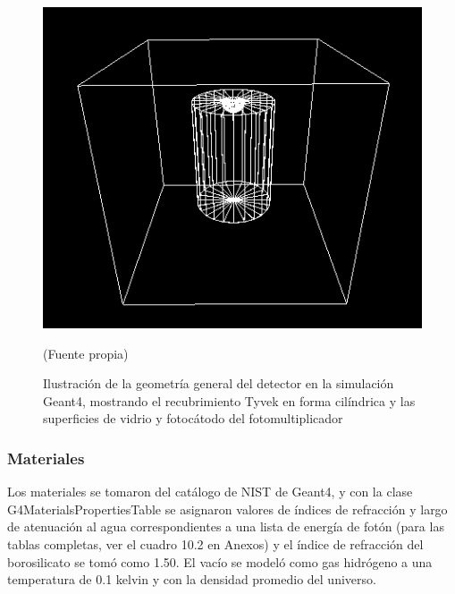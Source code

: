 \documentclass{book}
\begin{document}
\begin{figure}[h] %
\begin{center}
 \includegraphics[width = 0.8\linewidth]{GeometriaG4.png}
 
(Fuente propia)
\caption{Ilustraci\'on de la geometr\'ia general del detector en la simulaci\'on Geant4, mostrando el recubrimiento Tyvek en forma cil\'indrica y las superficies de vidrio y fotoc\'atodo del fotomultiplicador}
\end{center}
\end{figure}

\subsubsection{Materiales}
Los materiales se tomaron del cat\'alogo de NIST de Geant4, y con la clase G4MaterialsPropertiesTable se asignaron valores de \'indices de refracci\'on y largo de atenuaci\'on al agua correspondientes a una lista de energ\'ia de fot\'on (para las tablas completas, ver el cuadro 10.2 en Anexos) y el \'indice de refracci\'on del borosilicato se tom\'o como 1.50. El vac\'io se model\'o como gas hidr\'ogeno a una temperatura de 0.1 kelvin y con la densidad promedio del universo.
\end{document}
